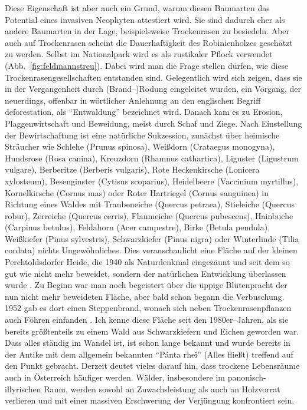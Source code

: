\documentclass[twocolumn]{scrartcl}
\begin{document}
Diese Eigenschaft ist aber auch ein Grund, warum diesen Baumarten das
Potential eines invasiven Neophyten attestiert wird. Sie sind dadurch
eher als andere Baumarten in der Lage, beispielsweise Trockenrasen zu
besiedeln.
Aber auch auf Trockenrasen scheint die Dauerhaftigkeit des
Robinienholzes geschätzt zu werden. Selbst im Nationalpark wird es als
rustikaler Pflock verwendet (Abb.~\ref{fig:feldmannstreu}).
Dabei wird man die Frage
stellen dürfen, wie diese Trockenrasengesellschaften entstanden sind.
Gelegentlich wird sich zeigen, dass sie in der Vergangenheit durch
(Brand\mbox{--)}Rodung eingeleitet wurden, ein Vorgang, der
neuerdings, offenbar in wörtlicher Anlehnung an den englischen Begriff
deforestation, als \enquote{Entwaldung} bezeichnet wird. Danach kam es
zu Erosion, Plaggenwirtschaft und Beweidung, meist durch Schaf und
Ziege. Nach Einstellung der Bewirtschaftung ist eine natürliche
Sukzession, zunächst über heimische Sträucher wie Schlehe (Prunus
spinosa), Weißdorn (Crataegus monogyna), Hundsrose (Rosa canina),
Kreuzdorn (Rhamnus cathartica), Liguster (Ligustrum vulgare),
Berberitze (Berberis vulgaris), Rote Heckenkirsche (Lonicera
xylosteum), Besenginster (Cytisus scoparius), Heidelbeere (Vaccinium
myrtillus), Kornelkirsche (Cornus mas) oder Roter Hartriegel (Cornus
sanguinea) in Richtung eines Waldes mit Traubeneiche (Quercus
petraea), Stieleiche (Quercus robur), Zerreiche (Quercus cerris),
Flaumeiche (Quercus pubescens), Hainbuche (Carpinus betulus),
Feldahorn (Acer campestre), Birke (Betula pendula), Weißkiefer (Pinus
sylvestris), Schwarzkiefer (Pinus nigra) oder Winterlinde (Tilia
cordata) nichts Ungewöhnliches. Dies veranschaulicht eine Fläche auf
der kleinen Perchtoldsdorfer Heide, die 1940 als Naturdenkmal
eingezäunt und seit dem so gut wie nicht mehr beweidet, sondern der
natürlichen Entwicklung überlassen wurde
\citep{rosenkranz1953heide}. Zu Beginn war man noch begeistert über
die üppige Blütenpracht der nun nicht mehr beweideten Fläche, aber
bald schon begann die Verbuschung. 1952 gab es dort einen
Steppenbrand, wonach sich neben Trockenrasenpflanzen auch Föhren
einfanden \citep{rosenkranz1953heideBrand}. Ich kenne diese Fläche
seit den 1980er--Jahren, als sie bereits größtenteils zu einem Wald
aus Schwarzkiefern und Eichen geworden war.
Dass alles ständig im Wandel ist, ist schon lange bekannt und wurde
bereits in der Antike mit dem allgemein bekannten \enquote{Pánta rheî}
(Alles fließt) treffend auf den Punkt gebracht.
Derzeit deutet vieles darauf hin, dass trockene Lebensräume auch in
Österreich häufiger werden. Wälder, insbesondere im
panonisch-illyrischen Raum, werden sowohl an Zuwachsleistung als auch
an Holzvorrat verlieren und mit einer massiven Erschwerung der
Verjüngung konfrontiert sein.
\end{document}
